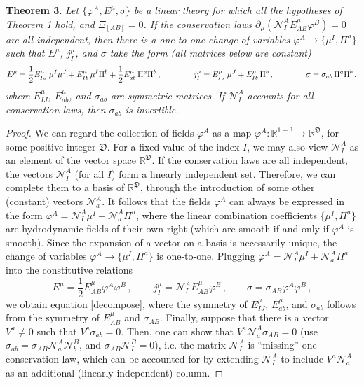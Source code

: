 \documentclass[aps,prl,singlecolumn,nofootinbib]{revtex4-2}
\theoremstyle{definition}
\theoremstyle{theorem}
\begin{document}
\textbf{Theorem 3}. 
\textit{Let $\{\varphi^A,E^\mu,\sigma \}$ be a linear theory for which all the hypotheses of Theorem 1 hold, and $\Xi_{[AB]}=0$. If the  conservation laws $\partial_\mu ( \mathcal{N}^A_I E^\mu_{AB} \varphi^B)=0$ are all independent, then there is a one-to-one change of variables $\varphi^A \rightarrow \{ \mu^I,\Pi^a \}$ such that $E^\mu$, $j_I^\mu$, and $\sigma$ take the form (all matrices below are constant)}
\begin{equation}\label{decompose}
    E^\mu = \dfrac{1}{2} E^\mu_{IJ} \, \mu^I \mu^J + E^\mu_{Ib} \, \mu^I \Pi^b +\dfrac{1}{2} E^\mu_{ab} \, \Pi^a \Pi^b \, ,\qquad \qquad 
    j^\mu_I =  E^\mu_{IJ} \,  \mu^J + E^\mu_{Ib} \, \Pi^b  \, , \qquad \qquad
    \sigma = \sigma_{ab} \, \Pi^a \Pi^b \, ,  \\
\end{equation}
\textit{where $E^\mu_{IJ}$, $E^\mu_{ab}$, and $\sigma_{ab}$ are symmetric matrices. If $\mathcal{N}^A_I$ accounts for all conservation laws, then $\sigma_{ab}$ is invertible.} 
\begin{proof}
We can regard the collection of fields $\varphi^A$ as a map $\varphi^A : \mathbb{R}^{1+3}\rightarrow \mathbb{R}^{\mathfrak{D}}$, for some positive integer $\mathfrak{D}$. For a fixed value of the index $I$, we may also view $\mathcal{N}^A_I$ as an element of the vector space $\mathbb{R}^{\mathfrak{D}}$. If the conservation laws are all independent, the vectors $\mathcal{N}^A_I$ (for all $I$) form a linearly independent set. Therefore, we can complete them to a basis of $\mathbb{R}^{\mathfrak{D}}$, through the introduction of some other (constant) vectors $\mathcal{N}^A_a$. It follows that the fields $\varphi^A$ can always be expressed in the form $\varphi^A=\mathcal{N}^A_I \mu^I+\mathcal{N}^A_a \Pi^a$, where the linear combination coefficients $\{\mu^I, \Pi^a \}$ are hydrodynamic fields of their own right (which are smooth if and only if $\varphi^A$ is smooth). Since the expansion of a vector on a basis is necessarily unique, the change of variables $\varphi^A \rightarrow \{\mu^I, \Pi^a \}$ is one-to-one. Plugging $\varphi^A=\mathcal{N}^A_I \mu^I+\mathcal{N}^A_a \Pi^a$ into the constitutive relations
\begin{equation}
     E^\mu= \dfrac{1}{2} E^\mu_{AB} \varphi^A \varphi^B\,, \, \qquad  j_I^\mu = \mathcal{N}^A_I E^\mu_{AB} \varphi^B \, , \qquad 
 \sigma =  \sigma_{AB} \varphi^A \varphi^B \,, 
\end{equation}
we obtain equation \eqref{decompose}, where the symmetry of $E^\mu_{IJ}$, $E^\mu_{ab}$, and $\sigma_{ab}$ follows from the symmetry of $E^\mu_{AB}$ and $\sigma_{AB}$. Finally, suppose that there is a vector $V^a \neq 0$ such that $V^a\sigma_{ab}=0$. Then, one can show that $V^a\mathcal{N}^A_a\sigma_{AB}=0$ (use $\sigma_{ab}=\sigma_{AB}\mathcal{N}^A_a\mathcal{N}^B_b$, and $\sigma_{AB}\mathcal{N}^B_I=0$), i.e. the matrix $\mathcal{N}^A_I$ is ``missing'' one conservation law, which can be accounted for by extending $\mathcal{N}^A_I$ to include $V^a\mathcal{N}^A_a$ as an additional (linearly independent) column. 
\end{proof}
\end{document}
